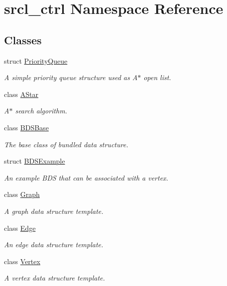 \hypertarget{namespacesrcl__ctrl}{\section{srcl\-\_\-ctrl Namespace Reference}
\label{namespacesrcl__ctrl}
}
\subsection*{Classes}
\begin{DoxyCompactItemize}
\item 
struct \hyperlink{structsrcl__ctrl_1_1PriorityQueue}{Priority\-Queue}
\begin{DoxyCompactList}\small\item\em A simple priority queue structure used as A$\ast$ open list. \end{DoxyCompactList}\item 
class \hyperlink{classsrcl__ctrl_1_1AStar}{A\-Star}
\begin{DoxyCompactList}\small\item\em A$\ast$ search algorithm. \end{DoxyCompactList}\item 
class \hyperlink{classsrcl__ctrl_1_1BDSBase}{B\-D\-S\-Base}
\begin{DoxyCompactList}\small\item\em The base class of bundled data structure. \end{DoxyCompactList}\item 
struct \hyperlink{structsrcl__ctrl_1_1BDSExample}{B\-D\-S\-Example}
\begin{DoxyCompactList}\small\item\em An example B\-D\-S that can be associated with a vertex. \end{DoxyCompactList}\item 
class \hyperlink{classsrcl__ctrl_1_1Graph}{Graph}
\begin{DoxyCompactList}\small\item\em A graph data structure template. \end{DoxyCompactList}\item 
class \hyperlink{classsrcl__ctrl_1_1Edge}{Edge}
\begin{DoxyCompactList}\small\item\em An edge data structure template. \end{DoxyCompactList}\item 
class \hyperlink{classsrcl__ctrl_1_1Vertex}{Vertex}
\begin{DoxyCompactList}\small\item\em A vertex data structure template. \end{DoxyCompactList}\end{DoxyCompactItemize}
